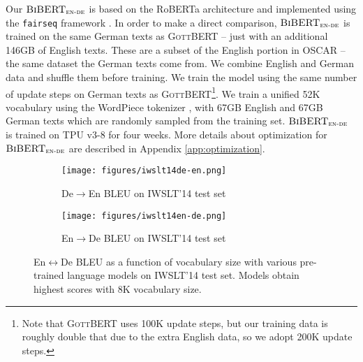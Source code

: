 \documentclass[11pt]{article}
\begin{document}
Our $\textsc{BiBERT}_\textsc{en-de}$ is based on the RoBERTa architecture \citep{liu2019roberta} and implemented using the \texttt{fairseq} framework \citep{ott-etal-2019-fairseq}. In order to make a direct comparison, $\textsc{BiBERT}_\textsc{en-de}$ is trained on the same German texts as \textsc{GottBERT} -- just with an additional 146GB of English texts. These are a subset of the English portion in OSCAR -- the same dataset the German texts come from. We combine English and German data and shuffle them before training. We train the model using the same number of update steps on German texts as \textsc{GottBERT}\footnote{Note that \textsc{GottBERT} uses 100K update steps, but our training data is roughly double that due to the extra English data, so we adopt 200K update steps.}. We train a unified 52K vocabulary using the WordPiece tokenizer \citep{wu2016google},  with 67GB English and 67GB German texts which are randomly sampled from the training set. $\textsc{BiBERT}_\textsc{en-de}$ is trained on TPU v3-8 for four weeks. More details about optimization for $\textsc{BiBERT}_\textsc{en-de}$ are described in Appendix \ref{app:optimization}.


\begin{figure}[ht]
     \centering
     \begin{subfigure}[b]{0.48\textwidth}
         \centering
         \texttt{[image: figures/iwslt14de-en.png]}
         \caption{De$\rightarrow$En BLEU on IWSLT'14 test set}
         \label{fig:iwslt14-de-en}
     \end{subfigure}
     \hfill
     \begin{subfigure}[b]{0.48\textwidth}
         \centering
         \texttt{[image: figures/iwslt14en-de.png]}
         \caption{En$\rightarrow$De BLEU on IWSLT'14 test set}
         \label{fig:iwslt14-en-de}
     \end{subfigure}
     \caption{En$\leftrightarrow$De BLEU as a function of vocabulary size with various pre-trained language models on IWSLT'14 test set. Models obtain highest scores with 8K vocabulary size.}
     \label{fig:iwslt14}
\end{figure}
\end{document}
